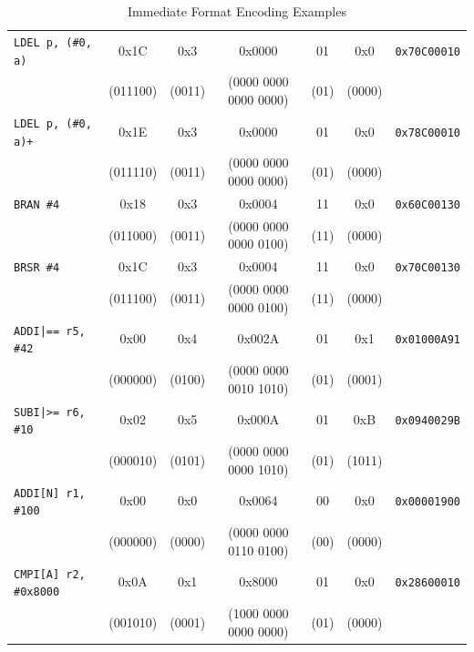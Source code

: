 \begin{table}[H]
\begin{tabular}{lcccccc}
		\midrule
		\texttt{LDEL p, (\#0, a)}     & 0x1C            & 0x3          & 0x0000                & 01          & 0x0           & \texttt{0x70C00010} \\
		                              & (011100)        & (0011)       & (0000 0000 0000 0000) & (01)        & (0000)        &                     \\
		\midrule
		\texttt{LDEL p, (\#0, a)+}    & 0x1E            & 0x3          & 0x0000                & 01          & 0x0           & \texttt{0x78C00010} \\
		                              & (011110)        & (0011)       & (0000 0000 0000 0000) & (01)        & (0000)        &                     \\
		\midrule
		\texttt{BRAN \#4}             & 0x18            & 0x3          & 0x0004                & 11          & 0x0           & \texttt{0x60C00130} \\
		                              & (011000)        & (0011)       & (0000 0000 0000 0100) & (11)        & (0000)        &                     \\
		\midrule
		\texttt{BRSR \#4}             & 0x1C            & 0x3          & 0x0004                & 11          & 0x0           & \texttt{0x70C00130} \\
		                              & (011100)        & (0011)       & (0000 0000 0000 0100) & (11)        & (0000)        &                     \\
		\midrule
		\texttt{ADDI|== r5, \#42}     & 0x00            & 0x4          & 0x002A                & 01          & 0x1           & \texttt{0x01000A91} \\
		                              & (000000)        & (0100)       & (0000 0000 0010 1010) & (01)        & (0001)        &                     \\
		\midrule
		\texttt{SUBI|>= r6, \#10}     & 0x02            & 0x5          & 0x000A                & 01          & 0xB           & \texttt{0x0940029B} \\
		                              & (000010)        & (0101)       & (0000 0000 0000 1010) & (01)        & (1011)        &                     \\
		\midrule
		\texttt{ADDI[N] r1, \#100}    & 0x00            & 0x0          & 0x0064                & 00          & 0x0           & \texttt{0x00001900} \\
		                              & (000000)        & (0000)       & (0000 0000 0110 0100) & (00)        & (0000)        &                     \\
		\midrule
		\texttt{CMPI[A] r2, \#0x8000} & 0x0A            & 0x1          & 0x8000                & 01          & 0x0           & \texttt{0x28600010} \\
		                              & (001010)        & (0001)       & (1000 0000 0000 0000) & (01)        & (0000)        &                     \\
		\bottomrule
	\end{tabular}
	\caption{Immediate Format Encoding Examples}
	\label{tab:immediate-format-examples}
\end{table}

